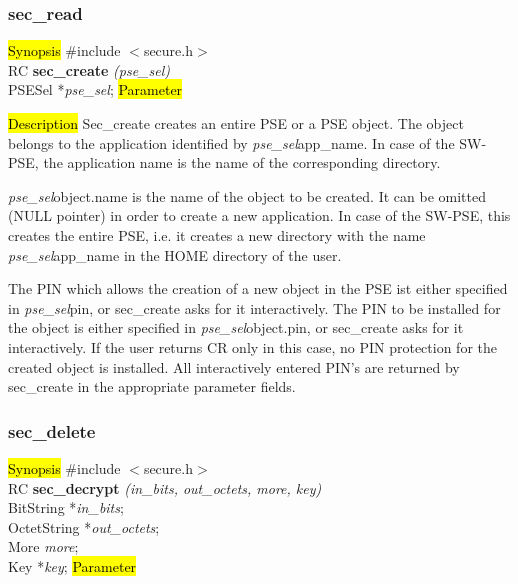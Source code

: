 \subsubsection{sec\_read}
\label{sec_create}
\hl{Synopsis}
\#include $<$secure.h$>$ \\ [0.5cm]
RC {\bf sec\_create} {\em (pse\_sel)} \\
PSESel *{\em pse\_sel};
\hl{Parameter}

\hl{Description}
Sec\_create creates an entire PSE or a PSE object. 
The object belongs to the application identified by {\em pse\_sel}\pf app\_name.
In case of the SW-PSE, the application name is the name of the corresponding directory. 

{\em pse\_sel}\pf object.name is the name of the object to be created. It can be omitted 
(NULL pointer) in order to create a new application. In case of the SW-PSE, 
this creates the entire PSE, i.e. it creates a new directory
with the name {\em pse\_sel}\pf app\_name in the HOME directory of
the user. 
 
The PIN which allows the creation of a new object in the PSE ist either specified in
{\em pse\_sel}\pf pin, or sec\_create asks for it interactively.
The PIN to be installed for the object
is either specified in {\em pse\_sel}\pf object.pin, or sec\_create asks for it interactively.
If the user returns CR only in this case, no PIN protection for the created object
is installed. All interactively entered PIN's are returned by sec\_create in the appropriate
parameter fields.

\subsubsection{sec\_delete}
\label{sec_decrypt}
\hl{Synopsis}
\#include $<$secure.h$>$ \\ [0.5cm]
RC {\bf sec\_decrypt} {\em (in\_bits, out\_octets, more, key)} \\
BitString *{\em in\_bits}; \\
OctetString *{\em out\_octets}; \\
More {\em more}; \\
Key *{\em key};
\hl{Parameter}


